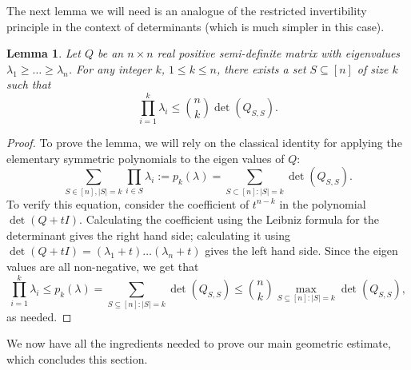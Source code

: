 \documentclass[12pt]{article}
\newtheorem{lemma}{Lemma}
\begin{document}
The next lemma we will need is an analogue of the restricted invertibility
principle in the context of determinants (which is much simpler in this case).

\begin{lemma}\label{lm:rip-det}
  Let $Q$ be an $n\times n$ real positive semi-definite matrix with
  eigenvalues $\lambda_1 \ge \ldots \ge \lambda_n$. For any integer
  $k$, $1 \le k \le n$, there exists a set $S \subseteq [n]$ of size $k$
  such that
  \[\prod_{i=1}^k \lambda_i \leq \binom{n}{k} \det(Q_{S,S}).\]
\end{lemma}
\begin{proof}
To prove the lemma, we will rely on the classical identity for applying the
elementary symmetric polynomials to the eigen values of $Q$:
\begin{equation*}
\sum_{S \in [n],|S|=k} \prod_{i \in S} \lambda_i := p_k(\lambda) = \sum_{S \subset [n]: |S| = k}\det(Q_{S,S}).
\end{equation*}
To verify this equation, consider the coefficient of $t^{n-k}$ in the polynomial
$\det(Q + tI)$. Calculating the coefficient using the Leibniz formula for the
determinant gives the right hand side; calculating it using $\det(Q + tI) =
(\lambda_1 + t)\ldots(\lambda_n + t)$ gives the left hand side. Since the eigen
values are all non-negative, we get that
\[
\prod_{i=1}^k \lambda_i \leq p_k(\lambda) =  
 \sum_{S \subseteq [n]: |S|=k} \det(Q_{S,S}) \leq \binom{n}{k} \max_{S
\subseteq [n]: |S|=k} \det(Q_{S,S}),
\]
as needed.
\end{proof}

We now have all the ingredients needed to prove our main geometric estimate,
which concludes this section.
\end{document}
